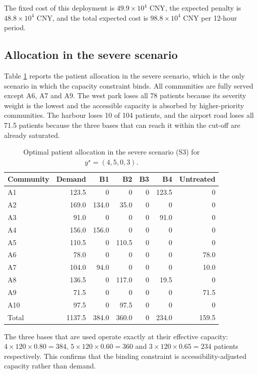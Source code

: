 \documentclass{apmcmthesis}
\begin{document}
The fixed cost of this deployment is $49.9\times10^{4}$ CNY, the expected penalty is $48.8\times10^{4}$ CNY, and the total expected cost is $98.8\times10^{4}$ CNY per 12-hour period.

\subsection{Allocation in the severe scenario}

Table \ref{tab:alloc} reports the patient allocation in the severe scenario, which is the only scenario in which the capacity constraint binds. All communities are fully served except A6, A7 and A9. The west park loses all 78 patients because its severity weight is the lowest and the accessible capacity is absorbed by higher-priority communities. The harbour loses 10 of 104 patients, and the airport road loses all 71.5 patients because the three bases that can reach it within the cut-off are already saturated.

\begin{table}[!ht]
\centering
\caption{Optimal patient allocation in the severe scenario (S3) for $y^{\star}=(4,5,0,3)$.}
\label{tab:alloc}
\small
\begin{tabular}{lrrrrrr}
\toprule
Community & Demand & B1 & B2 & B3 & B4 & Untreated \\
\midrule
A1  & 123.5 & 0    & 0    & 0 & 123.5 & 0 \\
A2  & 169.0 & 134.0 & 35.0 & 0 & 0   & 0 \\
A3  & 91.0  & 0    & 0    & 0 & 91.0  & 0 \\
A4  & 156.0 & 156.0 & 0   & 0 & 0     & 0 \\
A5  & 110.5 & 0    & 110.5 & 0 & 0   & 0 \\
A6  & 78.0  & 0    & 0    & 0 & 0     & 78.0 \\
A7  & 104.0 & 94.0 & 0    & 0 & 0     & 10.0 \\
A8  & 136.5 & 0    & 117.0 & 0 & 19.5 & 0 \\
A9  & 71.5  & 0    & 0    & 0 & 0     & 71.5 \\
A10 & 97.5  & 0    & 97.5 & 0 & 0     & 0 \\
\midrule
Total & 1137.5 & 384.0 & 360.0 & 0 & 234.0 & 159.5 \\
\bottomrule
\end{tabular}
\end{table}

The three bases that are used operate exactly at their effective capacity: $4\times120\times0.80=384$, $5\times120\times0.60=360$ and $3\times120\times0.65=234$ patients respectively. This confirms that the binding constraint is accessibility-adjusted capacity rather than demand.
\end{document}
